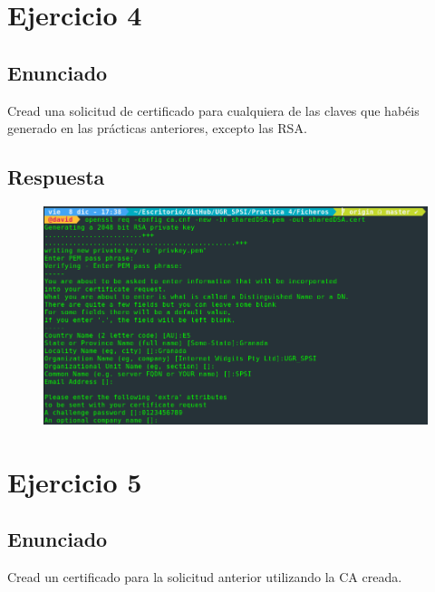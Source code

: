 \documentclass[10pt,a4paper,spanish]{report}
\begin{document}
\chapter{Ejercicio 4}

\section{Enunciado}
\noindent
Cread una solicitud de certificado para cualquiera de las claves que habéis generado en las prácticas anteriores, excepto las RSA.

\section{Respuesta}
\noindent

\begin{figure}[!hbp]
 \centering  \includegraphics[width=1\textwidth]{./Imagenes/4.png}
\end{figure}

\chapter{Ejercicio 5}

\section{Enunciado}
\noindent
Cread un certificado para la solicitud anterior utilizando la CA creada.
\end{document}
